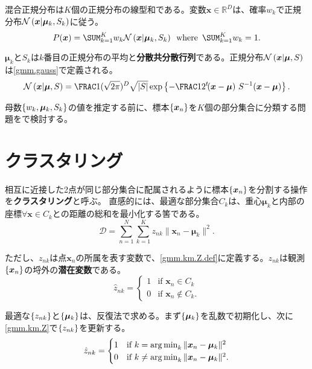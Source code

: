\documentclass[10pt,a4paper]{book}
\begin{document}
混合正規分布は$K$個の正規分布の線型和である。変数$\bm{x}\!\in\!\mathbb{R}^D$は、確率$w_k$で正規分布$\mathcal{N}\left(\bm{x}|\bm{\mu}_k,S_k\right)$に従う。
%
\begin{equation}
\label{eq:gmm}
P(\bm{x}) = \sum_{k=1}^K w_k \Nd{\bm{x}|\bm{\mu}_k,S_k} \where\sum_{k=1}^K w_k = 1.
\end{equation}

$\bm{\mu}_k$と$S_k$は$k$番目の正規分布の平均と\textbf{分散共分散行列}である。正規分布$\mathcal{N}\left(\bm{x}|\bm{\mu},S\right)$は\eqref{gmm.gauss}で定義される。
%
\begin{equation}
\label{eq:gmm.gauss}
\Nd{\bm{x}|\bm{\mu},S} = \frac{1}{(\sqrt{2\pi})^D\sqrt{|S|}} \exp \left\{-\frac{1}{2} \trans{(\bm{x}-\bm{\mu})} S^{-1} (\bm{x}-\bm{\mu})\right\}.
\end{equation}

母数$\seq{w_k,\bm{\mu}_k,S_k}$の値を推定する前に、標本$\seq{\bm{x}_n}$を$K$個の部分集合に分類する問題をで検討する。

\section{クラスタリング\label{sect:gmm.km}}

相互に近接した2点が同じ部分集合に配属されるように標本$\seq{\bm{x}_n}$を分割する操作を\textbf{クラスタリング}と呼ぶ。
直感的には、最適な部分集合$C_k$は、重心$\bm{\mu}_k$と内部の座標$\forall{}\bm{x}\!\in\!C_k$との距離の総和を最小化する筈である。
%
\begin{equation}
\label{eq:gmm.km.D}
\mathcal{D} = \sum_{n=1}^N \sum_{k=1}^K z_{nk} \|\bm{x}_n-\bm{\mu}_k\|^2.
\end{equation}

ただし、$z_{nk}$は点$\bm{x}_n$の所属を表す変数で、\eqref{gmm.km.Z.def}に定義する。$z_{nk}$は観測$\seq{\bm{x}_n}$の埒外の\textbf{潜在変数}である。
%
\begin{equation}
\label{eq:gmm.km.Z.def}
\hat{z}_{nk} =
\begin{cases}
1& \text{if $\bm{x}_n     \in C_k$}\\
0& \text{if $\bm{x}_n \not\in C_k$}.
\end{cases}
\end{equation}

最適な$\seq{z_{nk}}$と$\seq{\bm{\mu}_k}$は、反復法で求める。まず$\seq{\bm{\mu}_k}$を乱数で初期化し、次に\eqref{gmm.km.Z}で$\seq{z_{nk}}$を更新する。
%
\begin{equation}
\label{eq:gmm.km.Z}
\hat{z}_{nk} =
\begin{cases}
1& \text{if $k=   \operatorname*{arg\,min}_{k}\|\bm{x}_n-\bm{\mu}_k\|^2$}\\
0& \text{if $k\neq\operatorname*{arg\,min}_{k}\|\bm{x}_n-\bm{\mu}_k\|^2$}.
\end{cases}
\end{equation}
\end{document}
